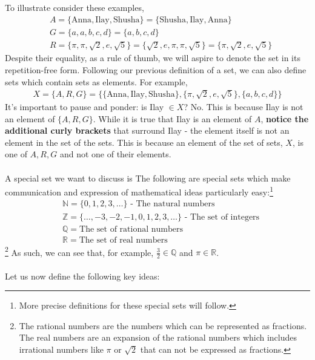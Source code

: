 \documentclass{tufte-handout} %
\theoremstyle{definition}
\theoremstyle{remark}
\begin{document}
To illustrate consider these examples,
\begin{align*}
    & A = \{\text{Anna}, \text{Ilay}, \text{Shusha}\} = \{\text{Shusha}, \text{Ilay}, \text{Anna} \} \\
    & G = \{a,a,b,c,d\} = \{a,b,c,d\} \\
    & R = \{\pi, \pi, \sqrt{2}, e, \sqrt{5}\} = \{\sqrt{2}, e, \pi, \pi, \sqrt{5}\} = \{\pi, \sqrt{2}, e, \sqrt{5}\}
\end{align*}
Despite their equality, as a rule of thumb, we will aspire to denote the set in its repetition-free form. Following our previous definition of a set, we can also define sets which contain sets as elements. For example, 
\begin{align*}
    X = \{A,R,G\} = \{\{\text{Anna}, \text{Ilay}, \text{Shusha}\}, \{\pi, \sqrt{2}, e, \sqrt{5}\}, \{a,b,c,d\}\}
\end{align*}
It's important to pause and ponder: is Ilay $\in X$? No. This is because Ilay is not an element of $\{A,R,G\}$. While it is true that Ilay is an element of $A$, \textbf{notice the additional curly brackets} that surround Ilay - the element itself is not an element in the set of the sets. This is because an element of the set of sets, $X$, is one of $A,R,G$ and not one of their elements. \\\\
A special set we want to discuss is The following are special sets which make communication and expression of mathematical ideas particularly easy:\footnote{More precise definitions for these special sets will follow.}
\begin{align*}
    &\mathbb{N} = \{0,1,2,3,\ldots\} \text{ - The natural numbers} \\
    &\mathbb{Z} = \{\ldots,-3,-2,-1,0,1,2,3,\ldots\} \text{ - The set of integers} \\
    &\mathbb{Q} = \text{The set of rational numbers} \\
    &\mathbb{R} = \text{The set of real numbers} 
\end{align*}\footnote{The rational numbers are the numbers which can be represented as fractions. The real numbers are an expansion of the rational numbers which includes irrational numbers like $\pi$ or $\sqrt{2}$ that can not be expressed as fractions.}
As such, we can see that, for example, $\frac{3}{2}\in \mathbb{Q}$ and $\pi \in \mathbb{R}$. \\\\
Let us now define the following key ideas: 
\end{document}
